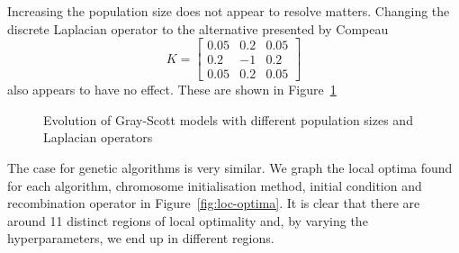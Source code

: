Increasing the population size does not appear to resolve matters. Changing the discrete Laplacian operator to the alternative presented by Compeau\cite{compeau}
\[
  K= \begin{bmatrix}
    0.05 & 0.2 & 0.05\\
    0.2 & -1 & 0.2\\
    0.05 & 0.2 & 0.05
  \end{bmatrix}
\]
also appears to have no effect. These are shown in Figure~\ref{fig:more-fails}\\

\begin{figure}[!h]
\centering
            \hfill
            \hfill
            \hfill
            \hfill
            \caption{Evolution of Gray-Scott models with different population sizes and Laplacian operators}
\label{fig:more-fails}
\end{figure}


The case for genetic algorithms is very similar. We graph the local optima found for each algorithm, chromosome initialisation method, initial condition and recombination operator in Figure~\ref{fig:loc-optima}. It is clear that there are around 11 distinct regions of local optimality and, by varying the hyperparameters, we end up in different regions.\\


